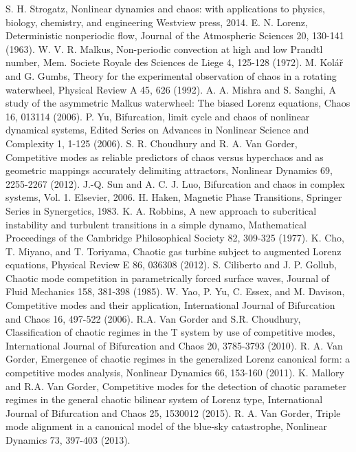 \begin{thebibliography}{99}
 S. H. Strogatz, Nonlinear dynamics and chaos: with applications to physics, biology, chemistry, and engineering Westview press, 2014.
 E. N. Lorenz, Deterministic nonperiodic flow, Journal of the Atmospheric Sciences 20, 130-141 (1963).
 W. V. R. Malkus, Non-periodic convection at high and low Prandtl number, Mem. Societe Royale des Sciences de Liege 4, 125-128 (1972).
 M. Kol{\'a}{\v{r}} and G. Gumbs, Theory for the experimental observation of chaos in a rotating waterwheel, Physical Review A 45, 626 (1992).
 A. A. Mishra and S. Sanghi, A study of the asymmetric Malkus waterwheel: The biased Lorenz equations, Chaos 16, 013114 (2006).
 P. Yu, Bifurcation, limit cycle and chaos of nonlinear dynamical systems, Edited Series on Advances in Nonlinear Science and Complexity 1, 1-125 (2006).
 S. R. Choudhury and R. A. Van Gorder, Competitive modes as reliable predictors of chaos versus hyperchaos and as geometric mappings accurately delimiting attractors, Nonlinear Dynamics 69, 2255-2267 (2012).
 J.-Q. Sun and A. C. J. Luo, Bifurcation and chaos in complex systems, Vol. 1. Elsevier, 2006.
 H. Haken, Magnetic Phase Transitions, Springer Series in Synergetics, 1983.
 K. A. Robbins, A new approach to subcritical instability and turbulent transitions in a simple dynamo, Mathematical Proceedings of the Cambridge Philosophical Society 82, 309-325 (1977).
 K. Cho, T. Miyano, and T. Toriyama, Chaotic gas turbine subject to augmented Lorenz equations, Physical Review E 86, 036308 (2012).
 S. Ciliberto and J. P. Gollub, Chaotic mode competition in parametrically forced surface waves, Journal of Fluid Mechanics 158, 381-398 (1985).
 W. Yao, P. Yu, C. Essex, and M. Davison, Competitive modes and their application, International Journal of Bifurcation and Chaos 16, 497-522 (2006).
 R.A. Van Gorder and S.R. Choudhury, Classification of chaotic regimes in the T system by use of competitive modes, International Journal of Bifurcation and Chaos 20, 3785-3793 (2010).
 R. A. Van Gorder, Emergence of chaotic regimes in the generalized Lorenz canonical form: a competitive modes analysis, Nonlinear Dynamics 66, 153-160 (2011).
 K. Mallory and R.A. Van Gorder, Competitive modes for the detection of chaotic parameter regimes in the general chaotic bilinear system of Lorenz type, {International Journal of Bifurcation and Chaos} {25}, 1530012 (2015).
 R. A. Van Gorder, Triple mode alignment in a canonical model of the blue-sky catastrophe, Nonlinear Dynamics 73, 397-403 (2013).
\end{thebibliography}




